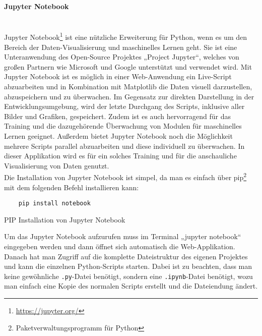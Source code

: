 \paragraph{Jupyter Notebook}\mbox{}\\
Jupyter Notebook\footnote{\url{https://jupyter.org/}} ist eine nützliche Erweiterung für Python, wenn es um den Bereich der Daten-Visualisierung und maschinelles Lernen geht. 
Sie ist eine Unteranwendung des Open-Source Projektes „Project Jupyter“, welches von großen Partnern wie Microsoft und Google unterstützt 
und verwendet wird. Mit Jupyter Notebook ist es möglich in einer Web-Anwendung ein Live-Script abzuarbeiten und in Kombination mit Matplotlib 
die Daten visuell darzustellen, abzuspeichern und zu überwachen. Im Gegensatz zur direkten Darstellung in der Entwicklungsumgebung, wird 
der letzte Durchgang des Scripts, inklusive aller Bilder und Grafiken, gespeichert. Zudem ist es auch hervorragend für das Training und 
die dazugehörende Überwachung von Modulen für maschinelles Lernen geeignet. Außerdem bietet Jupyter Notebook noch die Möglichkeit mehrere Scripts 
parallel abzuarbeiten und diese individuell zu überwachen. In dieser Applikation wird es für ein solches Training und für die anschauliche 
Visualisierung von Daten genutzt.\\

Die Installation von Jupyter Notebook ist simpel, da man es einfach über pip\footnote{Paketverwaltungsprogramm für Python} mit dem folgenden Befehl installieren kann:

\begin{listing}[H]
    \begin{verbatim}
    pip install notebook
    \end{verbatim}
    \caption{PIP Installation von Jupyter Notebook}
\end{listing}

Um das Jupyter Notebook aufzurufen muss im Terminal „jupyter notebook“ eingegeben werden und dann öffnet sich automatisch die Web-Applikation. 
Danach hat man Zugriff auf die komplette Dateistruktur des eigenen Projektes und kann die einzelnen Python-Scripts starten. Dabei ist zu beachten, 
dass man keine gewöhnliche \verb|.py|-Datei benötigt, sondern eine \verb|.ipynb|-Datei benötigt, wozu man einfach eine Kopie des normalen Scripts erstellt und die Dateiendung ändert.

